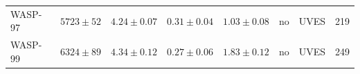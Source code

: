 \documentclass{aa}
\begin{document}
\begin{center}
\begin{table}
\begin{tabular}{llllllll}
    WASP-97  &   $5723 \pm 52 $        &  $4.24 \pm 0.07$                  &  $ 0.31 \pm 0.04$          &  $1.03 \pm 0.08$               & no                          &  UVES             &  219  \\
    WASP-99  &   $6324 \pm 89 $        &  $4.34 \pm 0.12$                  &  $ 0.27 \pm 0.06$          &  $1.83 \pm 0.12$               & no                          &  UVES             &  249  \\
\end{tabular}
\end{table}
\label{tab:results}
\end{center}
\end{document}
